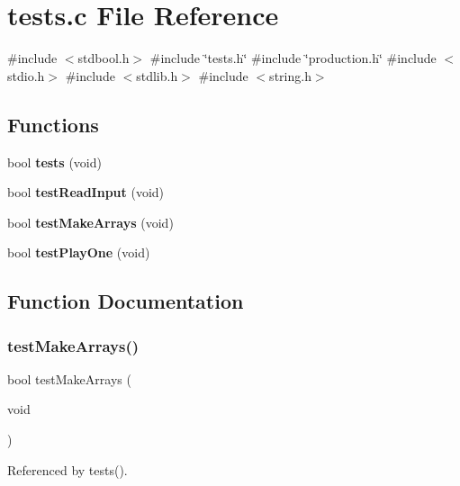 \section{tests.\+c File Reference}
\label{tests_8c}
{\ttfamily \#include $<$stdbool.\+h$>$}\newline
{\ttfamily \#include \char`\"{}tests.\+h\char`\"{}}\newline
{\ttfamily \#include \char`\"{}production.\+h\char`\"{}}\newline
{\ttfamily \#include $<$stdio.\+h$>$}\newline
{\ttfamily \#include $<$stdlib.\+h$>$}\newline
{\ttfamily \#include $<$string.\+h$>$}\newline
\subsection*{Functions}
\begin{DoxyCompactItemize}
\item 
bool \textbf{ tests} (void)
\item 
bool \textbf{ test\+Read\+Input} (void)
\item 
bool \textbf{ test\+Make\+Arrays} (void)
\item 
bool \textbf{ test\+Play\+One} (void)
\end{DoxyCompactItemize}


\subsection{Function Documentation}
\mbox{\label{tests_8c_af6e338851f3ccb4714e1bfb06ec4b428}} 
\subsubsection{test\+Make\+Arrays()}
{\footnotesize\ttfamily bool test\+Make\+Arrays (\begin{DoxyParamCaption}\item[{void}]{ }\end{DoxyParamCaption})}



Referenced by tests().

\mbox{\label{tests_8c_aa4c8095a20d90a18d843ab63ecd02d00}} 
